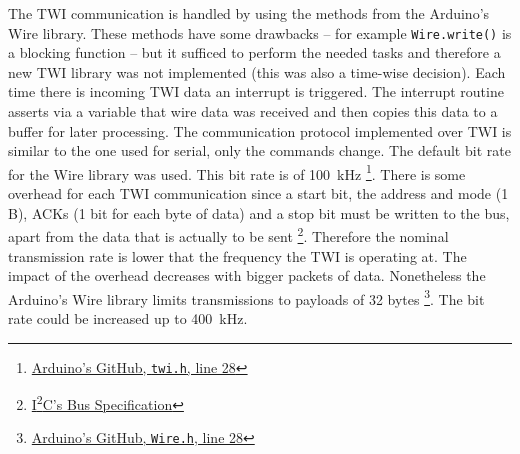 The TWI communication is handled by using the methods from the Arduino's Wire library. These methods have some drawbacks -- for example \texttt{Wire.write()} is a blocking function -- but it sufficed to perform the needed tasks and therefore a new TWI library was not implemented (this was also a time-wise decision). Each time there is incoming TWI data an interrupt is triggered. The interrupt routine asserts via a variable that wire data was received and then copies this data to a buffer for later processing. The communication protocol implemented over TWI is similar to the one used for serial, only the commands change. The default bit rate for the Wire library was used. This bit rate is of \SI{100}{\kilo\hertz} \footnote{\href{https://github.com/arduino/Arduino/blob/435fc323e0ab3b03bc5835e5309b5022bf57388a/hardware/arduino/avr/libraries/Wire/utility/twi.h\#L28}{Arduino's GitHub, \texttt{twi.h}, line 28}}. There is some overhead for each TWI communication since a start bit, the address and mode (1 B), ACKs (1 bit for each byte of data) and a stop bit must be written to the bus, apart from the data that is actually to be sent \footnote{\href{http://i2c.info/i2c-bus-specification}{I\textsuperscript{2}C's Bus Specification}}. Therefore the nominal transmission rate is lower that the frequency the TWI is operating at. The impact of the overhead decreases with bigger packets of data. Nonetheless the Arduino's Wire library limits transmissions to payloads of 32 bytes \footnote{\href{https://github.com/arduino/Arduino/blob/435fc323e0ab3b03bc5835e5309b5022bf57388a/hardware/arduino/avr/libraries/Wire/utility/twi.h\#L28}{Arduino's GitHub, \texttt{Wire.h}, line 28}}. The bit rate could be increased up to \SI{400}{\kilo\hertz}.

